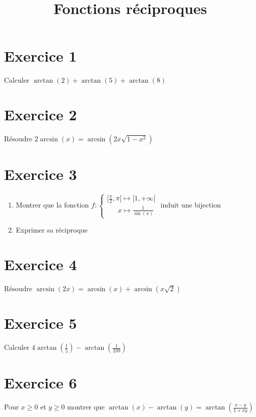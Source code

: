 \documentclass[11pt]{article}
\author{\Name \texttt{\Login}}
\date{}
\title{Fonctions réciproques}
\begin{document}
\maketitle

\section*{Exercice 1}

Calculer $\arctan(2) + \arctan(5) + \arctan(8)$

\section*{Exercice 2}

Résoudre $2\arcsin(x)=\arcsin(2x\sqrt{1-x^2})$

\section*{Exercice 3}
\begin{enumerate}
\item Montrer que la fonction $f:\begin{cases}
 [\frac{\pi}{2},\pi[\mapsto[1,+\infty[\\
 \quad\;\; x\mapsto\frac{1}{\sin(x)}
 \end{cases}$ induit une bijection
\item Exprimer sa réciproque
 
\end{enumerate}

\section*{Exercice 4}

Résoudre $\arcsin(2x) = \arcsin(x) + \arcsin(x\sqrt{2})$

\section*{Exercice 5}

Calculer $4\arctan(\frac{1}{5})-\arctan(\frac{1}{239})$

\section*{Exercice 6}

Pour $x\geq0$ et $y\geq0$ montrer que $\arctan(x)-\arctan(y) = \arctan(\frac{x-y}{1+xy})$
\end{document}
